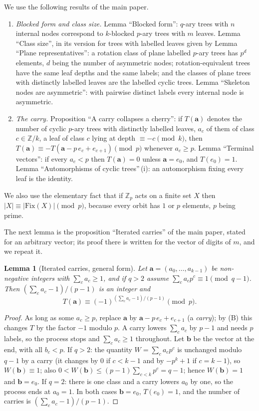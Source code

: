 \documentclass[11pt]{article}
\newtheorem{lemma}{Lemma}
\theoremstyle{remark}
\newcommand{\Z}{\mathbb Z}
\begin{document}
We use the following results of the main paper.
\begin{enumerate}[label=(\Alph*)]
\item \emph{Blocked form and class size.} Lemma ``Blocked form'': $q$-ary trees with $n$
      internal nodes correspond to $k$-blocked $p$-ary trees with $m$ leaves. Lemma ``Class
      size'', in its version for trees with labelled leaves given by Lemma ``Plane
      representatives'': a rotation class of plane labelled $p$-ary trees has $p^{d}$ elements,
      $d$ being the number of asymmetric nodes; rotation-equivalent trees have the same leaf
      depths and the same labels; and the classes of plane trees with distinctly labelled
      leaves are the labelled cyclic trees. Lemma ``Skeleton nodes are asymmetric'': with
      pairwise distinct labels every internal node is asymmetric.
\item \emph{The carry.} Proposition ``A carry collapses a cherry'': if $T(\mathbf a)$ denotes
      the number of cyclic $p$-ary trees with distinctly labelled leaves, $a_c$ of them of
      class $c\in\Z/k$, a leaf of class $c$ lying at depth $\equiv-c\pmod k$, then
      $T(\mathbf a)\equiv-T(\mathbf a-p\,e_c+e_{c+1})\pmod p$ whenever $a_c\ge p$. Lemma
      ``Terminal vectors'': if every $a_c<p$ then $T(\mathbf a)=0$ unless $\mathbf a=e_0$, and
      $T(e_0)=1$. Lemma ``Automorphisms of cyclic trees''\,(i): an automorphism fixing every
      leaf is the identity.
\end{enumerate}
We also use the elementary fact that if $\Z_p$ acts on a finite set $X$ then
$|X|\equiv|\mathrm{Fix}(X)|\pmod p$, because every orbit has $1$ or $p$ elements, $p$ being
prime.

The next lemma is the proposition ``Iterated carries'' of the main paper, stated for an
arbitrary vector; its proof there is written for the vector of digits of $m$, and we repeat it.

\begin{lemma}[Iterated carries, general form]\label{L0}
Let $\mathbf a=(a_0,\dots,a_{k-1})$ be non-negative integers with $\sum_ca_c\ge1$, and if
$q>2$ assume $\sum_ca_cp^c\equiv1\pmod{q-1}$. Then $(\sum_ca_c-1)/(p-1)$ is an integer and
\[
 T(\mathbf a)\equiv(-1)^{(\sum_ca_c-1)/(p-1)}\pmod p .
\]
\end{lemma}
\begin{proof}
As long as some $a_c\ge p$, replace $\mathbf a$ by $\mathbf a-p\,e_c+e_{c+1}$ (a \emph{carry});
by (B) this changes $T$ by the factor $-1$ modulo $p$. A carry lowers $\sum_ca_c$ by $p-1$ and
needs $p$ labels, so the process stops and $\sum_ca_c\ge1$ throughout. Let $\mathbf b$ be the
vector at the end, with all $b_c<p$.
If $q>2$: the quantity $W=\sum_ca_cp^c$ is unchanged modulo $q-1$ by a carry (it changes by $0$
if $c<k-1$ and by $-p^k+1$ if $c=k-1$), so $W(\mathbf b)\equiv1$; also
$0<W(\mathbf b)\le(p-1)\sum_{c<k}p^c=q-1$; hence $W(\mathbf b)=1$ and $\mathbf b=e_0$.
If $q=2$: there is one class and a carry lowers $a_0$ by one, so the process ends at $a_0=1$.
In both cases $\mathbf b=e_0$, $T(e_0)=1$, and the number of carries is
$(\sum_ca_c-1)/(p-1)$.
\end{proof}
\end{document}
